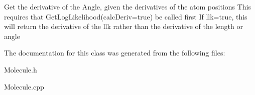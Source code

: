 Get the derivative of the Angle, given the derivatives of the atom positions This requires that Get\+Log\+Likelihood(calc\+Deriv=true) be called first If llk=true, this will return the derivative of the llk rather than the derivative of the length or angle 

The documentation for this class was generated from the following files\+:\begin{DoxyCompactItemize}
\item 
Molecule.\+h\item 
Molecule.\+cpp\end{DoxyCompactItemize}
